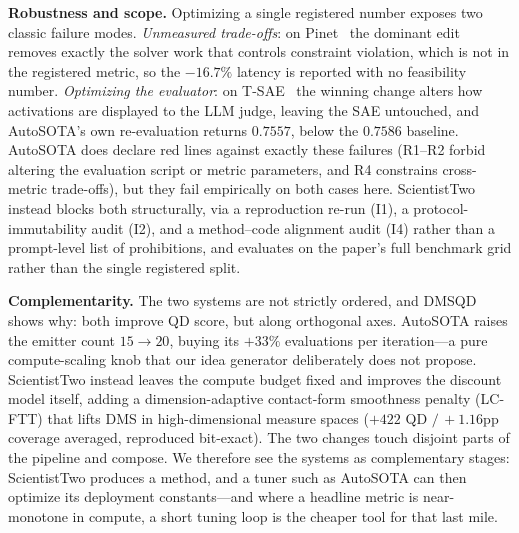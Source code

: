 \noindent\textbf{Robustness and scope.}
Optimizing a single registered number exposes two classic failure modes. \emph{Unmeasured
trade-offs}: on Pinet~\citep{grontas2026pinet} the dominant edit removes exactly the solver work
that controls constraint violation, which is not in the registered metric, so the $-16.7\%$
latency is reported with no feasibility number. \emph{Optimizing the evaluator}: on
T-SAE~\citep{bhalla2026temporal} the winning change alters how activations are displayed to the
LLM judge, leaving the SAE untouched, and AutoSOTA's own re-evaluation returns $0.7557$, below the
$0.7586$ baseline. AutoSOTA does declare red lines against exactly these failures (R1--R2 forbid
altering the evaluation script or metric parameters, and R4 constrains cross-metric trade-offs), but they fail empirically on both cases here. ScientistTwo instead blocks both structurally, via a
reproduction re-run (I1), a protocol-immutability audit (I2), and a method--code alignment audit
(I4) rather than a prompt-level list of prohibitions, and evaluates on the paper's full benchmark
grid rather than the single registered split.

\noindent\textbf{Complementarity.}
The two systems are not strictly ordered, and DMSQD~\citep{tjanaka2026discount} shows why: both
improve QD score, but along orthogonal axes. AutoSOTA raises the emitter count $15\!\to\!20$,
buying its $+33\%$ evaluations per iteration---a pure compute-scaling knob that our idea generator
deliberately does not propose. ScientistTwo instead leaves the compute budget fixed and improves
the discount model itself, adding a dimension-adaptive contact-form smoothness penalty
(\textsc{LC-FTT}) that lifts DMS in high-dimensional measure spaces ($+422$ QD $/\,{+}1.16$pp
coverage averaged, reproduced bit-exact). The two changes touch disjoint parts of the pipeline and
compose. We therefore see the systems as complementary
stages: ScientistTwo produces a method, and a tuner such as AutoSOTA can then optimize its
deployment constants---and where a headline metric is near-monotone in compute, a short tuning loop
is the cheaper tool for that last mile.


